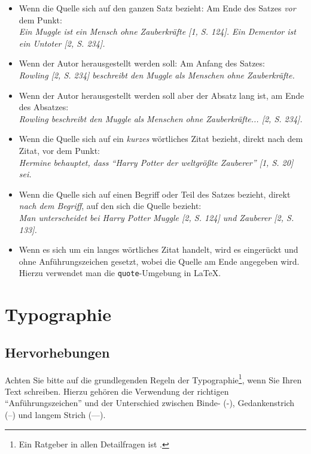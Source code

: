 \documentclass[conference,compsoc,final,a4paper]{IEEEtran}
\begin{document}
\begin{itemize}
\item Wenn die Quelle sich auf den ganzen Satz bezieht: Am Ende des Satzes \textit{vor} dem Punkt:\\ \textit{Ein Muggle ist ein Mensch ohne Zauberkräfte [1, S. 124]. Ein Dementor ist ein Untoter [2, S. 234].}
\item Wenn der Autor herausgestellt werden soll: Am Anfang des Satzes:\\ \textit{Rowling [2, S. 234] beschreibt den Muggle als Menschen ohne Zauberkräfte.}
\item Wenn der Autor herausgestellt werden soll aber der Absatz lang ist, am Ende des Absatzes:\\ \textit{Rowling beschreibt den Muggle als Menschen ohne Zauberkräfte... [2, S. 234].}
\item Wenn die Quelle sich auf ein \textit{kurzes} wörtliches Zitat bezieht, direkt nach dem Zitat, vor dem Punkt:\\ \textit{Hermine behauptet, dass \enquote{Harry Potter der weltgrößte Zauberer} [1, S. 20] sei.}
\item Wenn die Quelle sich auf einen Begriff oder Teil des Satzes bezieht, direkt \textit{nach dem Begriff}, auf den sich die Quelle bezieht:\\ \textit{Man unterscheidet bei Harry Potter Muggle [2, S. 124] und Zauberer [2, S. 133].}
\item Wenn es sich um ein langes wörtliches Zitat handelt, wird es eingerückt und ohne Anführungszeichen gesetzt, wobei die Quelle am Ende angegeben wird. Hierzu verwendet man die \texttt{quote}-Umgebung in \LaTeX.
\end{itemize}

\section{Typographie}
\subsection{Hervorhebungen}\label{Einleitung:Textauszeichnungen}
Achten Sie bitte auf die grundlegenden Regeln der Typographie\footnote{Ein Ratgeber in allen Detailfragen ist \cite{Forssman2002}.}, wenn Sie Ihren Text schreiben. Hierzu gehören \zb die Verwendung der richtigen "`Anführungszeichen"' und der Unterschied zwischen Binde- (-), Gedankenstrich (--) und langem Strich (---).
\end{document}

